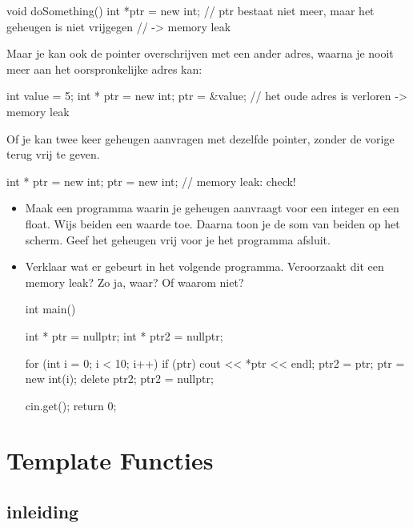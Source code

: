 \documentclass[11pt, oldfontcommands, oneside, a4paper]{memoir}
\begin{document}
\begin{code}
void doSomething()
{
    int *ptr = new int;
}
// ptr bestaat niet meer, maar het geheugen is niet vrijgegen
// -> memory leak
\end{code}

Maar je kan ook de pointer overschrijven met een ander adres, waarna je nooit meer aan het oorspronkelijke adres kan:

\begin{code}
int value = 5;
int * ptr = new int;
ptr = &value; // het oude adres is verloren -> memory leak
\end{code}

Of je kan twee keer geheugen aanvragen met dezelfde pointer, zonder de vorige terug vrij te geven.

\begin{code}
int * ptr = new int;
ptr = new int; // memory leak: check!
\end{code}

\begin{exercise}
	\begin{itemize}
		\item Maak een programma waarin je geheugen aanvraagt voor een integer en een float. Wijs beiden een waarde toe. Daarna toon je de som van beiden op het scherm. Geef het geheugen vrij voor je het programma afsluit.
		
		\item Verklaar wat er gebeurt in het volgende programma. Veroorzaakt dit een memory leak? Zo ja, waar? Of waarom niet?

		\begin{code}
int main()
{
  int * ptr = nullptr;
  int * ptr2 = nullptr;

  for (int i = 0; i < 10; i++) {    
    if (ptr) {
      cout << *ptr << endl;
      ptr2 = ptr;
    }
    ptr = new int(i);
    delete ptr2;
    ptr2 = nullptr;
  }

  cin.get();
  return 0;
}
		\end{code}

	\end{itemize}
\end{exercise}

\chapter{Template Functies}

\section{inleiding}
\end{document}
